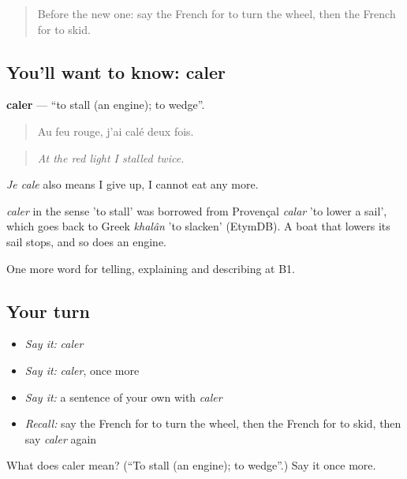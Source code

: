 \begin{quote}
Before the new one: say the French for to turn the wheel, then the French for to skid.
\end{quote}

\subsection*{You'll want to know: caler}
\textbf{caler} — \textquotedblleft{}to stall (an engine); to wedge\textquotedblright{}.

\begin{quote}
Au feu rouge, j'ai calé deux fois.
\end{quote}

\begin{quote}
\emph{At the red light I stalled twice.}
\end{quote}

\emph{Je cale} also means I give up, I cannot eat any more.

\begin{cousinweb}
\emph{caler} in the sense 'to stall' was borrowed from Provençal \emph{calar} 'to lower a sail', which goes back to Greek \emph{khalân} 'to slacken' (EtymDB). A boat that lowers its sail stops, and so does an engine.
\end{cousinweb}

\begin{grammarlens}[title={What you've built}]
One more word for telling, explaining and describing at B1.
\end{grammarlens}

\subsection*{Your turn}
\begin{itemize}
\raggedright
  \item \emph{Say it:} \emph{caler}
  \item \emph{Say it:} \emph{caler}, once more
  \item \emph{Say it:} a sentence of your own with \emph{caler}
  \item \emph{Recall:} say the French for to turn the wheel, then the French for to skid, then say \emph{caler} again
\end{itemize}

\begin{tcolorbox}[breakable,colback=teal!4,colframe=teal!35!black,title={Before you move on}]
What does caler mean? (\textquotedblleft{}To stall (an engine); to wedge\textquotedblright{}.) Say it once more.
\end{tcolorbox}
